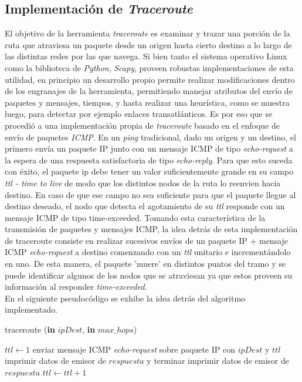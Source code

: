 \subsection{Implementación de \textsl{Traceroute}}

El objetivo de la herramienta \textsl{traceroute} es examinar y trazar una porción de la ruta que atraviesa un paquete desde un origen hasta cierto destino a lo largo de las distintas redes por las que navega. Si bien tanto el sistema operativo Linux como la biblioteca de \textit{Python}, \textsl{Scapy}, proveen robustas implementaciones de esta utilidad, en principio un desarrollo propio permite realizar modificaciones dentro de los engranajes de la herramienta, permitiendo manejar atributos del envío de paquetes y mensajes, tiempos, y hasta realizar una heurística, como se muestra luego, para detectar por ejemplo enlaces transatlánticos. Es por eso que se procedió a una implementación propia de \textsl{traceroute} basado en el enfoque de envío de paquetes \textit{ICMP}. En un \textit{ping} tradicional, dado un origen y un destino, el primero envía un paquete IP junto con un mensaje ICMP de tipo \textit{echo-request} a la espera de una respuesta satisfactoria de tipo \textit{echo-reply}. Para que esto suceda con éxito, el paquete ip debe tener un valor suficientemente grande en su campo \textit{ttl - time to live} de modo que los distintos nodos de la ruta lo reenvien hacia destino. En caso de que ese campo no sea suficiente para que el paquete llegue al destino deseado, el nodo que detecta el agotamiento de su \textit{ttl} responde con un mensaje ICMP de tipo {time-exceeded}. Tomando esta característica de la transmisión de paquetes y mensajes ICMP, la idea detrás de esta implementación de traceroute consiste en realizar sucesivos envíos de un paquete IP + mensaje ICMP \textit{echo-request} a destino comenzando con un \textit{ttl} unitario e incrementándolo en uno. De esta manera, el paquete 'muere' en distintos puntos del tramo y se puede identificar algunos de los nodos que se atraviesan ya que estos proveen su información al responder \textit{time-exceeded}.\\
\indent En el siguiente pseudocódigo se exhibe la idea detrás del algoritmo implementado.\\

\begin{algorithm}
\caption{traceroute (\textbf{in} $ipDest$, \textbf{in} $max\_hops$)}
\begin{algorithmic}[1]

\STATE $ttl \leftarrow 1$
	\STATE enviar mensaje ICMP \textsl{echo-request} sobre paquete IP con $ipDest$ y $ttl$
			\STATE imprimir datos de emisor de $respuesta$ y terminar
		\ELSE
			\STATE imprimir datos de emisor de $respuesta$
		\ENDIF
	\ENDIF
	\STATE $ttl \leftarrow ttl + 1$
\ENDWHILE
\end{algorithmic}
\end{algorithm}

